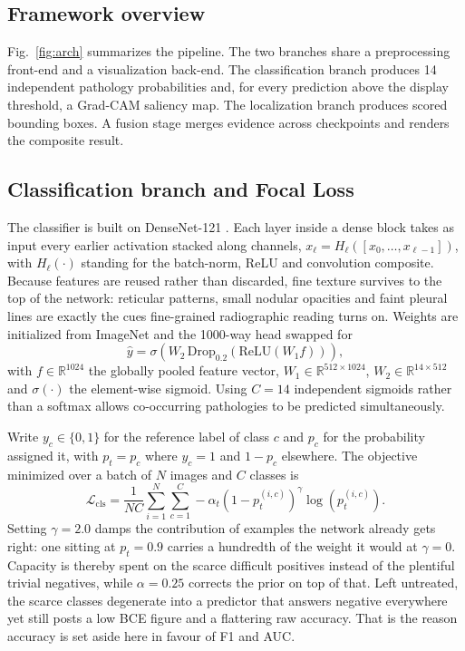 \documentclass[conference]{IEEEtran}
\begin{document}
\subsection{Framework overview}

Fig.~\ref{fig:arch} summarizes the pipeline. The two branches share a
preprocessing front-end and a visualization back-end. The classification branch
produces 14 independent pathology probabilities and, for every prediction above
the display threshold, a Grad-CAM saliency map. The localization branch
produces scored bounding boxes. A fusion stage merges evidence across
checkpoints and renders the composite result.

\subsection{Classification branch and Focal Loss}

The classifier is built on DenseNet-121 \cite{huang2017}. Each layer inside a
dense block takes as input every earlier activation stacked along channels,
$x_\ell = H_\ell([x_0, \ldots, x_{\ell-1}])$, with $H_\ell(\cdot)$ standing for
the batch-norm, ReLU and convolution composite. Because features are reused
rather than discarded, fine texture survives to the top of the network:
reticular patterns, small nodular opacities and faint pleural lines are exactly
the cues fine-grained radiographic reading turns on. Weights are initialized
from ImageNet \cite{deng2009} and the 1000-way head swapped for
\begin{equation}
\hat{y} = \sigma\!\left(W_2 \,\mathrm{Drop}_{0.2}(\mathrm{ReLU}(W_1 f))\right),
\end{equation}
with $f \in \mathbb{R}^{1024}$ the globally pooled feature vector, $W_1 \in
\mathbb{R}^{512 \times 1024}$, $W_2 \in \mathbb{R}^{14 \times 512}$ and
$\sigma(\cdot)$ the element-wise sigmoid. Using $C = 14$ independent sigmoids
rather than a softmax allows co-occurring pathologies to be predicted
simultaneously.

Write $y_c \in \{0,1\}$ for the reference label of class $c$ and $p_c$ for the
probability assigned it, with $p_t = p_c$ where $y_c = 1$ and $1 - p_c$ elsewhere. The
objective minimized over a batch of $N$ images and $C$ classes is
\begin{equation}
\mathcal{L}_{\mathrm{cls}} = \frac{1}{NC}\sum_{i=1}^{N}\sum_{c=1}^{C}
-\alpha_t \left(1 - p_t^{(i,c)}\right)^{\gamma} \log\!\left(p_t^{(i,c)}\right).
\end{equation}
Setting $\gamma = 2.0$ damps the contribution of examples the network already
gets right: one sitting at $p_t = 0.9$ carries a hundredth of the weight it
would at $\gamma = 0$. Capacity is thereby spent on the scarce difficult
positives instead of the plentiful trivial negatives, while $\alpha = 0.25$
corrects the prior on top of that. Left untreated, the scarce classes degenerate
into a predictor that answers negative everywhere yet still posts a low BCE
figure and a flattering raw accuracy. That is the reason accuracy is set aside
here in favour of F1 and AUC.
\end{document}

